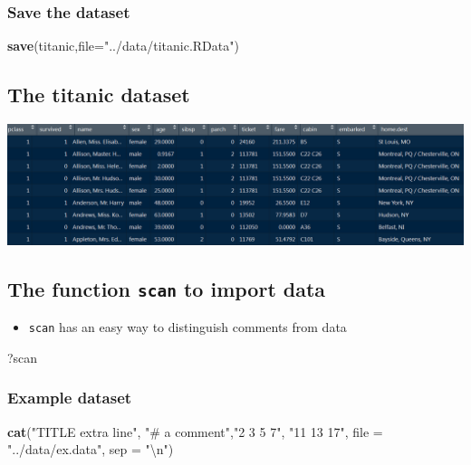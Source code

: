 \documentclass[10pt,]{article}
\newenvironment{Shaded}{\begin{snugshade}}{\end{snugshade}}
\newcommand{\KeywordTok}[1]{\textcolor[rgb]{0.13,0.29,0.53}{\textbf{#1}}}
\newcommand{\DataTypeTok}[1]{\textcolor[rgb]{0.13,0.29,0.53}{#1}}
\newcommand{\CharTok}[1]{\textcolor[rgb]{0.31,0.60,0.02}{#1}}
\newcommand{\StringTok}[1]{\textcolor[rgb]{0.31,0.60,0.02}{#1}}
\newcommand{\NormalTok}[1]{#1}
\providecommand{\tightlist}{%
  \setlength{\itemsep}{0pt}\setlength{\parskip}{0pt}}
\begin{document}
\subsubsection{Save the dataset}\label{save-the-dataset}

\begin{Shaded}
\begin{Highlighting}[]
\KeywordTok{save}\NormalTok{(titanic,}\DataTypeTok{file=}\StringTok{"../data/titanic.RData"}\NormalTok{)}
\end{Highlighting}
\end{Shaded}

\subsection{The titanic dataset}\label{the-titanic-dataset}

\includegraphics{figure/titanicdata.PNG}

\subsection{\texorpdfstring{The function \texttt{scan} to import
data}{The function scan to import data}}\label{the-function-scan-to-import-data}

\begin{itemize}
\tightlist
\item
  \texttt{scan} has an easy way to distinguish comments from data
\end{itemize}

\begin{Shaded}
\begin{Highlighting}[]
\NormalTok{?scan}
\end{Highlighting}
\end{Shaded}

\subsubsection{Example dataset}\label{example-dataset}

\begin{Shaded}
\begin{Highlighting}[]
\KeywordTok{cat}\NormalTok{(}\StringTok{"TITLE extra line"}\NormalTok{, }\StringTok{"# a comment"}\NormalTok{,}\StringTok{"2 3 5 7"}\NormalTok{, }\StringTok{"11 13 17"}\NormalTok{, }
    \DataTypeTok{file =} \StringTok{"../data/ex.data"}\NormalTok{, }\DataTypeTok{sep =} \StringTok{"}\CharTok{\textbackslash{}n}\StringTok{"}\NormalTok{)}
\end{Highlighting}
\end{Shaded}
\end{document}
